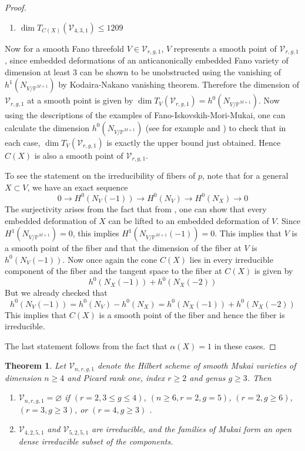 \documentclass[11pt,twoside]{amsart}
\theoremstyle{plain}
\numberwithin{equation}{section}
\newtheorem{theorem}{Theorem}[section]
\theoremstyle{definition}
\begin{document}
\begin{proof}
\begin{enumerate}
      \item $\operatorname{dim}T_{C(X)}(\mathcal{V}_{4,3,1}) \leq 1209$
  \end{enumerate}
Now for a smooth Fano threefold $V \in \mathcal{V}_{r,g,1}$, $V$ represents a smooth point of $\mathcal{V}_{r,g,1}$, since embedded deformations of an anticanonically embedded Fano variety of dimension at least $3$ can be shown to be unobstructed using the vanishing of $h^1(N_{V/\mathbb{P}^{M+1}})$ by Kodaira-Nakano vanishing theorem. Therefore the dimension of $\mathcal{V}_{r,g,1}$ at a smooth point is given by $\operatorname{dim}T_V(\mathcal{V}_{r,g,1}) = h^0(N_{V/\mathbb{P}^{M+1}})$. Now using the descriptions of the examples of Fano-Iskovskih-Mori-Mukai, one can calculate the dimension $h^0(N_{V/\mathbb{P}^{M+1}})$ (see for example \cite[Table $2$, pg $666$]{CLM93} and \cite[Table $3.1$]{CLM98}) to check that in each case, $\operatorname{dim}T_V(\mathcal{V}_{r,g,1})$ is exactly the upper bound just obtained. Hence $C(X)$ is also a smooth point of $\mathcal{V}_{r,g,1}$. \par
To see the statement on the irreducibility of fibers of $p$, note that for a general $X \subset V$, we have an exact sequence 
$$0 \to H^0(N_V(-1)) \to H^0(N_V) \to H^0(N_X) \to 0$$
The surjectivity arises from the fact that from , one can show that every embedded deformation of $X$ can be lifted to an embedded deformation of $V$. Since $H^1(N_{V/\mathbb{P}^{M+1}}) = 0$, this implies $H^1(N_{V/\mathbb{P}^{M+1}}(-1)) = 0$. This implies that $V$ is a smooth point of the fiber and that the dimension of the fiber at $V$ is $h^0(N_V(-1))$. Now once again the cone $C(X)$ lies in every irreducible component of the fiber and the tangent space to the fiber at $C(X)$ is given by 
$$h^0(N_X(-1))+h^0(N_X(-2))$$
But we already checked that 
$$h^0(N_V(-1)) = h^0(N_V) - h^0(N_X) = h^0(N_X(-1))+h^0(N_X(-2))$$
This implies that $C(X)$ is a smooth point of the fiber and hence the fiber is irreducible. \par
The last statement follows from the fact that $\alpha(X) = 1$ in these cases. 

  
\end{proof}

\begin{theorem}\label{classification of Mukai varieties with index two}
Let $\mathcal{V}_{n,r,g,1}$ denote the Hilbert scheme of smooth Mukai varieties of dimension $n \geq 4$ and Picard rank one, index $r \geq 2$ and genus $g \geq 3$. Then 
\begin{enumerate}
    \item $\mathcal{V}_{n,r,g,1} = \varnothing$ if $(r = 2, 3 \leq g \leq 4)$, $(n \geq 6, r = 2, g = 5)$, $(r = 2, g \geq 6)$, $(r = 3, g \geq 3)$, or $(r = 4, g \geq 3)$ . 
    \item $\mathcal{V}_{4,2,5,1}$ and $\mathcal{V}_{5,2,5,1}$ are irreducible, and the families of Mukai form an open dense irreducible subset of the components.
\end{enumerate}
\end{theorem}
\end{document}
